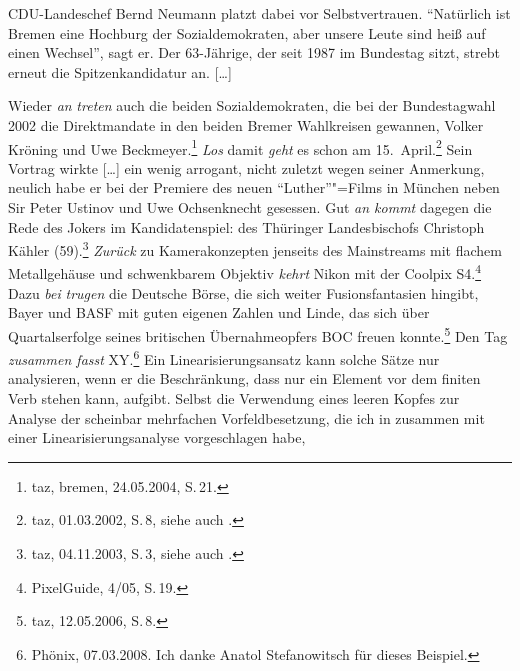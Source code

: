 CDU-Landeschef Bernd Neumann platzt dabei vor Selbstvertrauen. "`Natürlich ist Bremen eine Hochburg der Sozialdemokraten, aber unsere Leute sind heiß auf einen Wechsel"', sagt er. Der 63-Jährige, der seit 1987 im Bundestag sitzt, strebt erneut die Spitzenkandidatur an. [\ldots]

Wieder \emph{an} \emph{treten} auch die beiden Sozialdemokraten, die bei der Bundestagwahl 2002 die Direktmandate in den beiden Bremer Wahlkreisen gewannen, Volker Kröning und Uwe Beckmeyer.\footnote{
  taz, bremen, 24.05.2004, S.\,21.
}
\ex\label{bsp-los-damit}
\emph{Los} damit \emph{geht} es schon am 15.\ April.\footnote{
        taz, 01.03.2002, S.\,8, siehe auch .
    }
\ex Sein Vortrag wirkte [\ldots] %
ein wenig arrogant, nicht zuletzt wegen seiner Anmerkung,
neulich habe er bei der Premiere des neuen "`Luther"'"=Films in München neben
Sir Peter Ustinov und Uwe Ochsenknecht gesessen. %
Gut \emph{an kommt} dagegen die Rede des Jokers im Kandidatenspiel: des Thüringer Landesbischofs Christoph Kähler (59).\footnote{
        taz, 04.11.2003, S.\,3, siehe auch .%
}
\ex
\emph{Zurück} zu Kamerakonzepten jenseits des Mainstreams mit flachem Metallgehäuse und schwenkbarem Objektiv \emph{kehrt} Nikon mit der
Coolpix S4.\footnote{
  PixelGuide, 4/05, S.\,19.
}
\ex Dazu \emph{bei} \emph{trugen} die Deutsche Börse, die sich weiter Fusionsfantasien hingibt, Bayer und BASF
mit guten eigenen Zahlen und Linde, das sich über Quartalserfolge seines britischen Übernahmeopfers
BOC freuen konnte.\footnote{
  taz, 12.05.2006, S.\,8. 
}
\ex Den Tag \emph{zusammen fasst} XY.\footnote{
     Phönix, 07.03.2008. Ich danke Anatol Stefanowitsch für dieses
     Beispiel.
}
\zl
\largerpage
Ein Linearisierungsansatz kann solche Sätze nur analysieren, 
wenn er die Beschränkung, dass nur ein Element vor dem finiten Verb stehen kann, aufgibt.
Selbst die Verwendung eines leeren Kopfes zur Analyse der scheinbar mehrfachen Vorfeldbesetzung,
die ich in  zusammen mit einer Linearisierungsanalyse vorgeschlagen habe,
